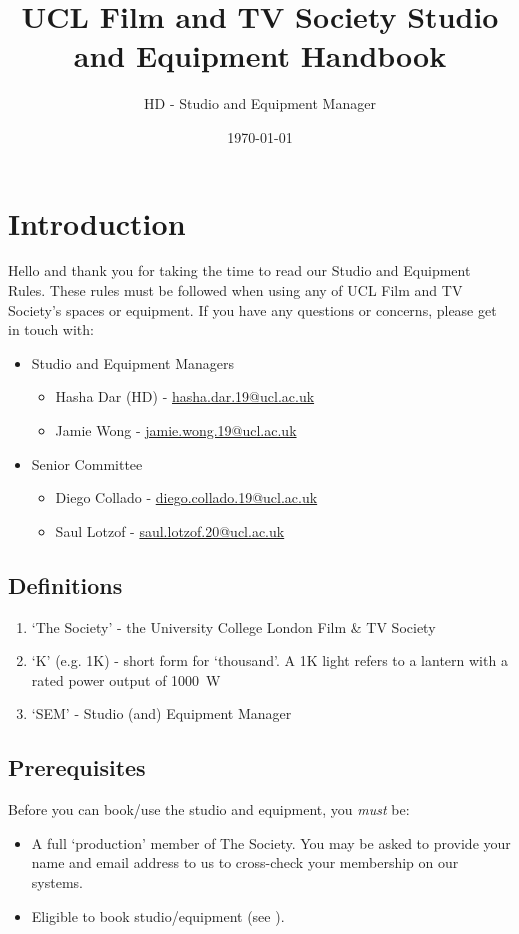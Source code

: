 \documentclass[]{article}
\begin{document}
\title{UCL Film and TV Society Studio and Equipment Handbook}
\author{HD - Studio and Equipment Manager}
\date{\today}
\maketitle
\tableofcontents
\section{Introduction}
Hello and thank you for taking the time to read our Studio and Equipment Rules. These rules must be followed when using any of UCL Film and TV Society's spaces or equipment. If you have any questions or concerns, please get in touch with:
\begin{itemize}
    \item Studio and Equipment Managers
          \begin{itemize}
              \item Hasha Dar (HD) - \href{mailto:hasha.dar.19@ucl.ac.uk}{hasha.dar.19@ucl.ac.uk}
              \item Jamie Wong - \href{mailto:jamie.wong.19@ucl.ac.uk}{jamie.wong.19@ucl.ac.uk}
          \end{itemize}
    \item Senior Committee
          \begin{itemize}
              \item Diego Collado - \href{mailto:diego.collado.19@ucl.ac.uk}{diego.collado.19@ucl.ac.uk}
              \item Saul Lotzof - \href{mailto:saul.lotzof.20@ucl.ac.uk}{saul.lotzof.20@ucl.ac.uk}
          \end{itemize}
\end{itemize}
\subsection{Definitions}
\begin{enumerate}
    \item `The Society' - the University College London Film \& TV Society
    \item `K' (e.g. 1K) - short form for `thousand'. A 1K light refers to a lantern with a rated power output of \SI{1000}{\watt}
    \item `SEM' - Studio (and) Equipment Manager
\end{enumerate}
\subsection{Prerequisites}
Before you can book/use the studio and equipment, you \textit{must} be:
\begin{itemize}
    \item A full `production' member of The Society. You may be asked to provide your name and email address to us to cross-check your membership on our systems.
    \item Eligible to book studio/equipment (see ).
\end{itemize}
\end{document}

